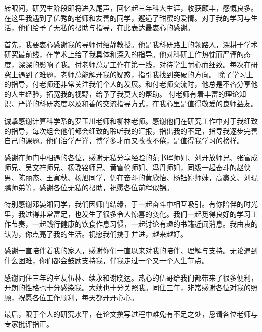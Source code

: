 

\begin{ack}
	转眼间，研究生阶段即将进入尾声，回忆起三年科大生涯，收获颇丰，感慨良多。在这里我遇到了优秀的老师和友善的同学，邂逅了甜蜜的爱情。对于我的学习与生活，他们给予了无私的帮助与指导，在此表达最衷心的感谢。

	首先，我要衷心感谢我的导师付绍静教授。他是我科研路上的领路人，深耕于学术研究最前线，在学术上给了我具体和深入的指导。他对科研工作热忱而严谨的态度，深深的影响了我。付老师总是工作在第一线，对待学生耐心而细致。每次在研究上遇到了难题，老师总能解开我的疑惑，指引我找到突破的方向。
	除了学习上的指导，付老师还非常关注我们个人的发展。和付老师交流时，他总是不吝分享他的人生经验，拓宽我的视野，给予了我莫大的帮助。
	付老师有着丰富的理论知识、严谨的科研态度以及和善的交流指导方式，在我心里是值得敬爱的良师益友。
	
	诚挚感谢计算科学系的罗玉川老师和柳林老师。感谢他们在研究工作中对于我细致的指导，每次组会他们都会细致的聆听我的汇报，指出我的不足，指导我逐步完善自己的课题。他们治学严谨，博学多才而又孜孜不倦，是值得我学习的榜样。

	感谢在师门中相遇的各位，感谢无私分享经验的范书珲师姐、刘开放师兄、张富成师兄、吴文祥师兄、杨璐铭师兄、黄雪伦师姐、冯丹师姐，同级一起奋斗的赵侠男、陈丽杰、王寅秋、杨旭同学，仍在奋斗的黄欣怡、杨钰婷师妹，高鑫文、刘琨鹏师弟等，感谢各位无私的帮助，祝愿各位前程似锦。

	特别感谢邓晏湘同学，我们因师门结缘，于一起奋斗中相互吸引。有你陪伴的时光里，我过得非常富足，也发生了很多令人惊喜的变化。我们一起觅得良好的学习工作节奏，一起践行健康的饮食作息习惯，一起讨论有趣的书籍近闻消息。我由衷的认为，你点亮了我的生活。祝愿我们携手并进，越来越好。
	
	感谢一直陪伴着我的家人，感谢你们一直以来对我的陪伴、理解与支持。无论遇到什么困难，你们都会鼓励支持我，伴我走过一个又一个人生节点。
	
	感谢同住三年的室友伍林、续永和谢晓达。热心的伍哥给我们都带来了很多便利，开朗的性格也十分感染我。大续也十分关照我。同住三年，非常感谢各位对我的照顾，祝愿各位工作顺利，每天都开开心心。
	
	最后，限于个人的研究水平，在论文撰写过程中难免有不足之处，恳请各位老师与专家批评指正。

\end{ack}

